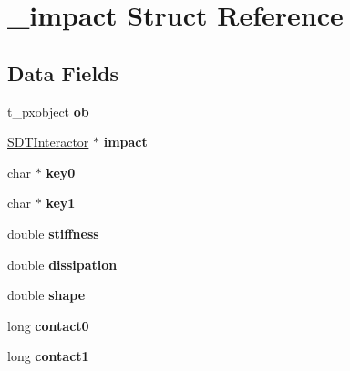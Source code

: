 \hypertarget{struct__impact}{}\section{\+\_\+impact Struct Reference}
\label{struct__impact}
\subsection*{Data Fields}
\begin{DoxyCompactItemize}
\item 
\hypertarget{struct__impact_a55b4380edb216f04a1c42b9095594963}{}t\+\_\+pxobject {\bfseries ob}\label{struct__impact_a55b4380edb216f04a1c42b9095594963}

\item 
\hypertarget{struct__impact_a7bec74f3454296e3bf0db3104b6d70ce}{}\hyperlink{struct_s_d_t_interactor}{S\+D\+T\+Interactor} $\ast$ {\bfseries impact}\label{struct__impact_a7bec74f3454296e3bf0db3104b6d70ce}

\item 
\hypertarget{struct__impact_ac2e1b301fde8fcd4867bc37f7432b345}{}char $\ast$ {\bfseries key0}\label{struct__impact_ac2e1b301fde8fcd4867bc37f7432b345}

\item 
\hypertarget{struct__impact_ad9fbb57ecc842a70f5ace70ead34f3ac}{}char $\ast$ {\bfseries key1}\label{struct__impact_ad9fbb57ecc842a70f5ace70ead34f3ac}

\item 
\hypertarget{struct__impact_a9e58169b625b632c35218c00425d2b87}{}double {\bfseries stiffness}\label{struct__impact_a9e58169b625b632c35218c00425d2b87}

\item 
\hypertarget{struct__impact_a56d6259aa049232668739998678cce42}{}double {\bfseries dissipation}\label{struct__impact_a56d6259aa049232668739998678cce42}

\item 
\hypertarget{struct__impact_aa45a20e816e161660b8c2697a5b4bb46}{}double {\bfseries shape}\label{struct__impact_aa45a20e816e161660b8c2697a5b4bb46}

\item 
\hypertarget{struct__impact_adc3c8fa3b5e48541d8196e00883f17c6}{}long {\bfseries contact0}\label{struct__impact_adc3c8fa3b5e48541d8196e00883f17c6}

\item 
\hypertarget{struct__impact_a4739b87d34995bacf6fe560f453d5a8f}{}long {\bfseries contact1}\label{struct__impact_a4739b87d34995bacf6fe560f453d5a8f}


\end{DoxyCompactItemize}
